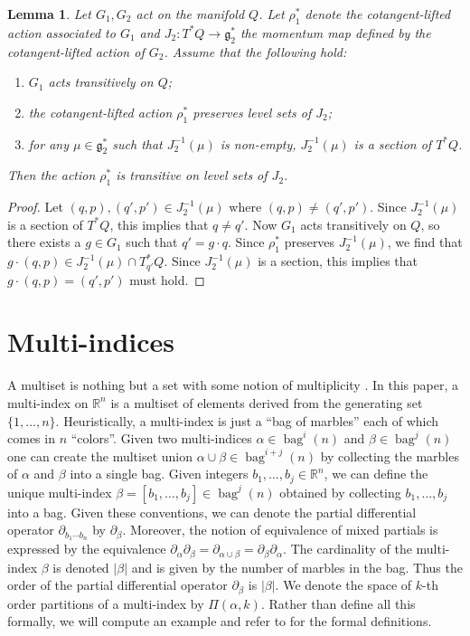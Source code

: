 \documentclass[12pt]{amsart}
\newcommand{\R}{\ensuremath{\mathbb{R}}}
\newtheorem{lem}[thm]{Lemma}
\DeclareMathOperator{\bag}{bag}
\begin{document}
\begin{lem}\label{lem:transitive-action}
  Let $G_1, G_2$ act on the manifold $Q$. Let $\rho_1^*$ denote the
  cotangent-lifted action associated to $G_1$ and
  $J_2\colon T^*Q \to \mathfrak{g}_2^*$ the momentum map defined by
  the cotangent-lifted action of $G_2$. Assume that the following
  hold:
  \begin{enumerate}
  \item $G_1$ acts transitively on $Q$;
  \item the cotangent-lifted action $\rho_1^*$ preserves level sets of $J_2$;
  \item for any $\mu \in \mathfrak{g}_2^*$ such that $J_2^{-1}(\mu)$
    is non-empty, $J_2^{-1}(\mu)$ is a section of $T^* Q$.
  \end{enumerate}
  Then the action $\rho_1^*$ is transitive on level sets of $J_2$.
\end{lem}

\begin{proof}
  Let $(q,p), (q',p') \in J_2^{-1}(\mu)$ where $(q,p) \neq (q',p')$.
  Since $J_2^{-1}(\mu)$ is a section of $T^* Q$, this implies that
  $q \neq q'$. Now $G_1$ acts transitively on $Q$, so there exists a
  $g \in G_1$ such that $q' = g \cdot q$. Since $\rho_1^*$ preserves
  $J_2^{-1}(\mu)$, we find that
  $g \cdot (q,p) \in J_2^{-1}(\mu) \cap T_{q'}^* Q$. Since
  $J_2^{-1}(\mu)$ is a section, this implies that
  $g \cdot (q,p) = (q',p')$ must hold.
\end{proof}


\section{Multi-indices}
\label{sec:multi}
A multiset is nothing but a set with some notion of multiplicity \cite{Blizard1989}.
In this paper, a multi-index on $\R^n$ is a multiset of elements derived from the generating set $\{1,\dots,n\}$.
Heuristically, a multi-index is just a ``bag of marbles'' each of which comes in $n$ ``colors''.
Given two multi-indices $\alpha \in \bag^i(n)$ and $\beta \in \bag^j(n)$ one can create the
multiset union $\alpha \cup \beta \in \bag^{i+j}(n)$ by collecting the marbles of $\alpha$ and $\beta$ into a single bag.
Given integers $b_1,\dots,b_j \in \R^n$, we can define the unique multi-index $\beta = [b_1,\dots,b_j] \in \bag^j(n)$
obtained by collecting $b_1,\dots,b_j$ into a bag.
Given these conventions, we can denote the partial differential operator $\partial_{b_1 \cdots b_n }$ by $\partial_\beta$.
Moreover, the notion of equivalence of mixed partials is expressed by the equivalence 
$\partial_\alpha \partial_\beta = \partial_{\alpha \cup \beta} = \partial_\beta \partial_\alpha$.
The cardinality of the multi-index $\beta$ is denoted $|\beta|$ and is given by the number of marbles in the bag.
Thus the order of the partial differential operator $\partial_{\beta}$ is $|\beta|$.
We denote the space of $k$-th order partitions of a multi-index by $\Pi(\alpha,k)$.
Rather than define all this formally, we will compute an example and refer to \cite{Jacobs2014b} for the formal definitions.
\end{document}
